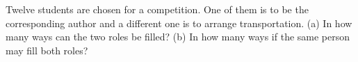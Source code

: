 Twelve students are chosen for a competition. One of them is to be the corresponding author and a different one is to arrange transportation. (a) In how many ways can the two roles be filled? (b) In how many ways if the same person may fill both roles?
